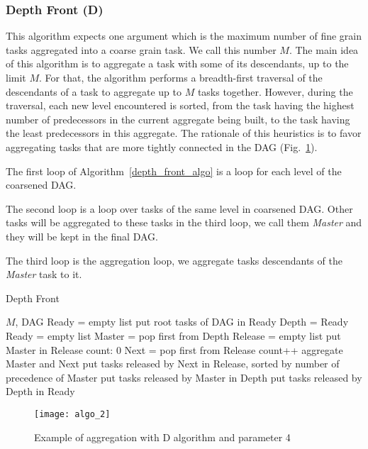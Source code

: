 \subsubsection{Depth Front (D)}
This algorithm expects one argument which is the maximum number of
fine grain tasks aggregated into a coarse grain task. We call this
number $M$.
The main idea of this algorithm is to aggregate a task with some
of its descendants, up to the limit $M$. For that, the algorithm
performs a breadth-first traversal of the descendants of a task to
aggregate up to $M$ tasks together. However, during the traversal, each new
level encountered is sorted, from the task having the highest
number of predecessors in the current aggregate being built, to
the task having the least predecessors in this aggregate. The
rationale of this heuristics is to favor aggregating tasks that
are more tightly connected in the DAG (Fig.~\ref{fig:D_algo}).


The first loop of Algorithm~\ref{depth_front_algo} is a loop for each
level of the coarsened DAG.

The second loop is a loop over tasks of the same level in coarsened DAG.
Other tasks will be aggregated to these tasks in the third loop, we call them
{\em Master} and they will be kept in the final DAG.

The third loop is the aggregation loop, we aggregate tasks descendants of
the {\em Master} task to it.

\begin{algorithm}
  \caption{Depth Front}
  \label{depth_front_algo}
  \begin{algorithmic} 
    \REQUIRE $M$, DAG
    \STATE Ready = empty list
    \STATE put root tasks of DAG in Ready
    \STATE Depth = Ready
    \STATE Ready = empty list
    \STATE Master = pop first from Depth
    \STATE Release = empty list
    \STATE put Master in Release
    \STATE count: 0
    \STATE Next = pop first from Release
    \STATE count++
    \STATE aggregate Master and Next
    \STATE put tasks released by Next in Release, sorted by
    \STATE \quad number of precedence of Master
    \ENDWHILE
    \STATE put tasks released by Master in Depth
    \ENDWHILE
    \STATE put tasks released by Depth in Ready
    \ENDWHILE
  \end{algorithmic}
\end{algorithm}

\begin{figure}[t!]
  \centering
  \texttt{[image: algo\_2]}
  \caption{Example of aggregation with D algorithm and parameter 4}
  \label{fig:D_algo}
\end{figure}

